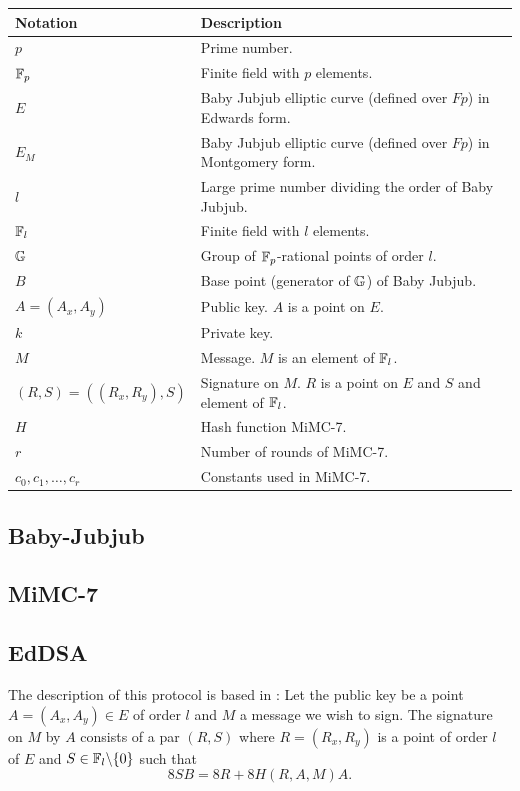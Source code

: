 \documentclass{article}
\begin{document}
\begin{spacing}{1.2}
		\begin {table}[h!]
	\centering
	\begin{tabular}{|l|l|}
		\hline
		{\bf Notation} & {\bf Description}\\
		\hline
		{$p$} & {Prime number.}\\
		{$\mathbb{F}_p$} & {Finite field with $p$ elements.}\\
		{$E$} & {Baby Jubjub elliptic curve (defined over $Fp$) in Edwards form.}\\
		{$E_M$} & {Baby Jubjub elliptic curve (defined over $Fp$) in Montgomery form.}\\
		{$l$} & {Large prime number dividing the order of Baby Jubjub.}\\
		{$\mathbb{F}_l$} & {Finite field with $l$ elements.}\\
		{$\mathbb{G}$} & {Group of $\mathbb{F}_p$-rational points of order $l$.}\\
		{$B$} & {Base point (generator of $\mathbb{G}$) of Baby Jubjub.}\\
		\hline
		{$A = (A_x, A_y)$} & {Public key. $A$ is a point on $E$. }\\
		$k$ & Private key. \\
		$M$ & Message. $M$ is an element of $\mathbb{F}_l$. \\		
		{$(R,S) = ((R_x, R_y), S)$} & Signature on $M$. $R$ is a point on $E$ and $S$ and element of $\mathbb{F}_l$.\\
		\hline		
		{$H$} & {Hash function MiMC-7.}\\
		$r$ & Number of rounds of MiMC-7. \\
		$c_0, c_1, \dots, c_r$ & Constants used in MiMC-7. \\
		\hline
	\end{tabular}
	\label{tab:notation}
	\end{table}
	
	\subsection{Baby-Jubjub} 	
	\subsection{MiMC-7}			
	\subsection{EdDSA}
	
	The description of this protocol is based in \cite{eddsa}:  
%	
%	
	Let the public key be a point $A = (A_x, A_y)\in E$ of order $l$ and $M$ a message we wish to sign. The signature on $M$ by $A$ consists of a par $(R,S)$ where $R = (R_x, R_y)$ is a point of order $l$ of $E$ and $S\in\mathbb{F}_l\backslash\{0\}$ such that 
			$$ 8SB = 8R + 8H(R,A,M)A.	$$
		

\end{spacing}
\end{document}
